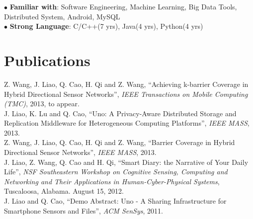\documentclass[margin, centered]{resume}
\begin{document}
\begin{resume}
	$\bullet$ \textbf{Familiar with}: Software Engineering, Machine Learning, Big Data Tools, Distributed System, Android, MySQL\\
    $\bullet$ \textbf{Strong Language}: C/C++(7 yrs), Java(4 yrs), Python(4 yrs)\vspace{-5mm}\\

    \section{\mysidestyle Publications}
    Z. Wang, J. Liao, Q. Cao, H. Qi and Z. Wang, ``Achieving k-barrier Coverage in Hybrid Directional Sensor Networks'', \emph{IEEE Transactions on Mobile Computing (TMC)}, 2013, to appear. \vspace{1mm} \\
    J. Liao, K. Lu and Q. Cao, ``Uno: A Privacy-Aware Distributed Storage and Replication Middleware for Heterogeneous Computing Platforms'', \emph{IEEE MASS}, 2013. \vspace{1mm} \\
    Z. Wang, J. Liao, Q. Cao, H. Qi and Z. Wang, ``Barrier Coverage in Hybrid Directional Sensor Networks'', \emph{IEEE MASS}, 2013.\vspace{1mm} \\
    J. Liao, Z. Wang, Q. Cao and H. Qi, ``Smart Diary: the Narrative of Your Daily Life'', \emph{NSF Southeastern Workshop on Cognitive Sensing, Computing and Networking and Their Applications in Human-Cyber-Physical Systems}, Tuscaloosa, Alabama. August 15, 2012. \vspace{1mm} \\
    J. Liao and Q. Cao, ``Demo Abstract: Uno - A Sharing Infrastructure for Smartphone Sensors and Files'', \emph{ACM SenSys}, 2011.\\ \vspace{-5mm}
    

\end{resume}
\end{document}
